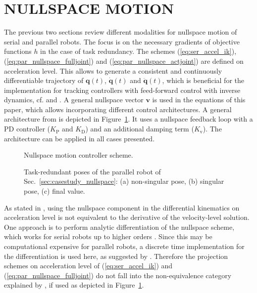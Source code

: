 \documentclass[a4paper,twoside]{article}
\begin{document}
\section{\uppercase{Nullspace Motion}}
\label{sec:control_loop}

The previous two sections review different modalities for nullspace motion of serial and parallel robots.
The focus is on the necessary gradients of objective functions $h$ in the case of task redundancy.
The schemes (\ref{eq:ser_accel_ik}), (\ref{eq:par_nullspace_fulljoint}) and (\ref{eq:par_nullspace_actjoint}) are defined on acceleration level.
This allows to generate a consistent and continuously differentiable trajectory of $\bm{q}(t)$, $\dot{\bm{q}}(t)$ and $\ddot{\bm{q}}(t)$, which is beneficial for the implementation for tracking controllers with feed-forward control with inverse dynamics, cf. \cite{DeLucaOriSic1992} and \cite{ReiterMueGat2018}.
A general nullspace vector $\bm{v}$ is used in the equations of this paper, which allows incorporating different control architectures.
A general architecture from \cite{DeLucaOriSic1992} is depicted in Figure~\ref{fig:control_loop}.
It uses a nullspace feedback loop with a PD controller ($K_\mathrm{P}$ and $K_\mathrm{D}$) and an additional damping term ($K_\mathrm{v}$).
The architecture can be applied in all cases presented.


\begin{figure}[tb]
	
	\caption{Nullspace motion controller scheme.}
	\label{fig:control_loop}
\end{figure}


\begin{figure}[tb] %
	
	\caption{Task-redundant poses of the parallel robot of Sec.~\ref{sec:casestudy_nullspace}: (a) non-singular pose, (b) singular pose, (c) final value.}
	\label{fig:pkm_poses}
\end{figure}

As stated in \cite{ReiterMueGat2018}, using the nullspace component in the differential kinematics on acceleration level is not equivalent to the derivative of the velocity-level solution.
One approach is to perform analytic differentiation of the nullspace scheme, which works for serial robots up to higher orders \cite{ReiterMueGat2018}.
Since this may be computational expensive for parallel robots, a discrete time implementation for the differentiation is used here, as suggested by \cite{DeLucaOriSic1992}.
Therefore the projection schemes on acceleration level of (\ref{eq:ser_accel_ik}) and (\ref{eq:par_nullspace_fulljoint}) do not fall into the non-equivalence category explained by \cite{ReiterMueGat2018}, if used as depicted in Figure~\ref{fig:control_loop}.
\end{document}
